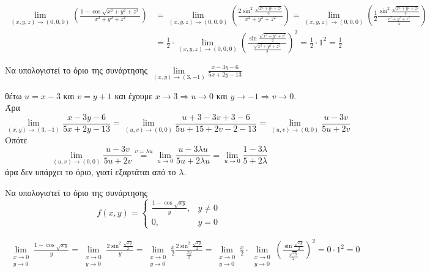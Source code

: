 \documentclass[a4paper,11pt]{report}
\begin{document}
\begin{example}
  \begin{align*} 
    \lim\limits_{(x,y,z)\to (0, 0, 0)} 
    \left( \frac{1- \cos{\sqrt{x^2+y^2+z^2}}}{x^2+y^2+z^2}\right) 
    &= \lim\limits_{(x,y,z)\to (0, 0, 0)} 
    \left( \frac{2 \sin^{2}{\frac{\sqrt{x^2+y^2+z^2}}{2}}}{x^{2}+y^2+z^2} \right) = 
    \lim\limits_{(x,y,z)\to (0, 0, 0)} 
    \left( \frac{1}{2}\frac{\sin^{2}{{\frac{\sqrt{x^2+y^2+z^2}}{2}}}}{\frac{x^{2}+
      y^{2}+z^2}{4}} 
    \right) \\
    &= \frac{1}{2} \cdot \lim\limits_{(x,y,z)\to (0, 0, 0)} 
    \left(\frac{\sin{{\frac{\sqrt{x^2+y^2+z^2}}{2}}}}{\frac{\sqrt{x^{2}+
      y^{2}+z^2}}{2}} 
    \right)^{2} = \frac{1}{2} \cdot 1^{2} = \frac{1}{2}
  \end{align*}
\end{example}

\begin{example}
  Να υπολογιστεί το όριο της συνάρτησης 
  $ \lim\limits_{(x,y)\to (3, -1)} \frac{x-3y-6}{5x+2y-13} $ 
  \begin{solution}
    θέτω $ u=x-3 $ και $ v=y+1 $ και έχουμε $ x \to 3 \Rightarrow u \to 0 $ και 
    $ y \to -1 \Rightarrow v \to 0 $. Άρα
    \[
      \lim\limits_{(x,y)\to (3, -1)} \frac{x-3y-6}{5x+2y-13} = \lim_{(u,v) \to (0,0)} 
      \frac{u+3-3v+3-6}{5u+15+2v-2-13} = \lim_{(u,v) \to (0,0)} \frac{u-3v}{5u+2v}
    \] 
    Οπότε
    \[
      \lim_{(u,v) \to (0,0)} \frac{u-3v}{5u+2v} \overset{v= \lambda u}{=} 
      \lim_{u \to 0} \frac{u- 3 \lambda u}{5u + 2 \lambda u} = \lim_{u \to 0}
      \frac{1 - 3 \lambda}{5 + 2 \lambda}
    \]
    άρα δεν υπάρχει το όριο, γιατί εξαρτάται από το $ \lambda $.
  \end{solution}
\end{example}

\begin{example}
  Να υπολογιστεί το όριο της συνάρτησης
  \[
    f(x,y) = 
    \begin{cases} 
      \frac{1 - \cos{\sqrt{xy}}}{y}, & y \neq 0 \\ 0, & y =0 
    \end{cases}  
  \] 
  \begin{solution}
    \begin{align*}
      \lim\limits_{\substack{x\to 0 \\y \to 0}} \frac{1- \cos{\sqrt{xy}}}{y} =
      \lim\limits_{\substack{x\to 0 \\y \to 0}} \frac{2
      \sin^{2}{\frac{\sqrt{xy}}{2}}}{y} = 
      \lim\limits_{\substack{x\to 0 \\y \to 0}} \frac{x}{2} \frac{2
      \sin^{2}{\frac{\sqrt{xy}}{2}}}{\frac{xy}{2}} =
      \lim\limits_{\substack{x\to 0 \\y \to 0}} \frac{x}{2} 
      \cdot\lim\limits_{\substack{x\to 0 \\y \to 0}}
      \left(\frac{\sin{\frac{\sqrt{xy}}{2}}}{\frac{\sqrt{xy}}{2}} \right)^{2} 
      = 0 \cdot 1^{2} = 0 
    \end{align*} 
  \end{solution}
\end{example}
\end{document}
